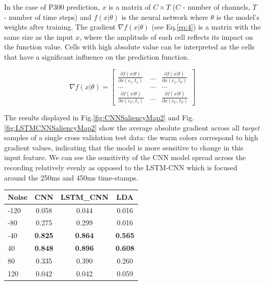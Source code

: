\documentclass[
12pt, %
english, %
doublespacing, %
headsepline, %
]{MastersDoctoralThesis} %
\begin{document}
	In the case of P300 prediction, $x$ is a matrix of $C\times{T}$ ($C$ - number of channels, $T$ - number of time steps) and $f(x|\theta)$ is the neural network where $\theta$ is the model's weights after training. The gradient $\nabla{f(x|\theta)}$ (see Eq.\ref{eq:4}) is a matrix with the same size as the input $x$, where the amplitude of each cell reflects its impact on the function value. Cells with high absolute value can be interpreted as the cells that have a significant influence on the prediction function.
	
	
	\begin{equation}\label{eq:4}
	\nabla f\left( {x|\theta } \right) = \left[ {\begin{array}{*{20}{c}}
		{\frac{{\partial f\left( {x|\theta } \right)}}{{\partial x\left( {{c_1},{t_1}} \right)}}}&{...}&{\frac{{\partial f\left( {x|\theta } \right)}}{{\partial x\left( {{c_1},{t_T}} \right)}}}\\
		{...}&{...}&{...}\\
		{\frac{{\partial f\left( {x|\theta } \right)}}{{\partial x\left( {{c_C},{t_1}} \right)}}}&{...}&{\frac{{\partial f\left( {x|\theta } \right)}}{{\partial x\left( {{c_C},{t_T}} \right)}}}
		\end{array}} \right]
	\end{equation}

\vspace{1cm}
The results displayed in Fig.\ref{fig:CNNSaliencyMap2} and Fig.\ref{fig:LSTMCNNSaliencyMap2} show the average absolute gradient across all \textit{target} samples of a single cross validation test data: the warm colors correspond to high gradient values, indicating that the model is more sensitive to change in this input feature. We can see the sensitivity of the CNN model spread across the recording relatively evenly as opposed to the LSTM-CNN which is focused around the 250ms and 450ms time-stamps.

\begin{small}

	\label{table:ResistenceToNoise}
	\centering
	
	\begin{tabular}{l|ccc}
		\toprule
		{Noise} &  CNN &  LSTM\_CNN &  LDA\\
		\midrule
		-120  &         0.058 &              0.044 &         0.016 \\
		-80   &         0.275 &              0.299 &         0.016 \\
		-40   &         \textbf{0.825} &              \textbf{0.864} &  \textbf{0.565} \\
		40   &         \textbf{0.848} &              \textbf{0.896} &   \textbf{0.608} \\
		80   &         0.335 &              0.390 &         0.260 \\
		120  &         0.042 &              0.042 &         0.059 \\
		\bottomrule
	\end{tabular}
\end{small}
\end{document}
